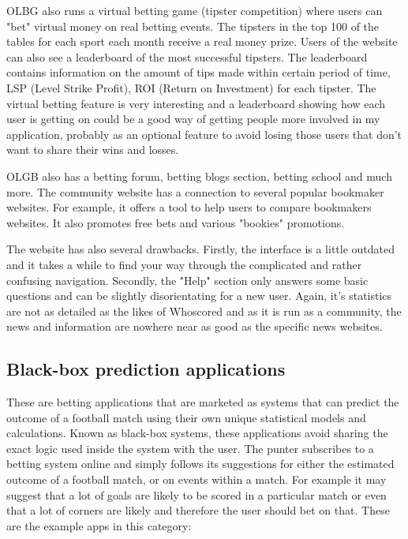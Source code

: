 OLBG also runs a virtual betting game (tipster competition) where users can "bet" virtual money on real betting events. The tipsters in the top 100 of the tables for each sport each month receive a real money prize. Users of the website can also see a leaderboard of the most successful tipsters. The leaderboard contains information on the amount of tips made within certain period of time, LSP (Level Strike Profit), ROI (Return on Investment) for each tipster. The virtual betting feature is very interesting and a leaderboard showing how each user is getting on could be a good way of getting people more involved in my application, probably as an optional feature to avoid losing those users that don’t want to share their wins and losses.

OLGB also has a betting forum, betting blogs section, betting school and much more. The community website has a connection to several popular bookmaker websites. For example, it offers a tool to help users to compare bookmakers websites. It also promotes free bets and various "bookies" promotions.

The website has also several drawbacks. Firstly, the interface is a little outdated and it takes a while to find your way through the complicated and rather confusing navigation. Secondly, the "Help" section only answers some basic questions and can be slightly disorientating for a new user. Again, it’s statistics are not as detailed as the likes of Whoscored and as it is run as a community, the news and information are nowhere near as good as the specific news websites.

\subsection{Black-box prediction applications}
\label{subsec:blackboxapplications_req}
These are betting applications that are marketed as systems that can predict the outcome of a football match using their own unique statistical models and calculations. Known as black-box systems, these applications avoid sharing the exact logic used inside the system with the user. The punter subscribes to a betting system online and simply follows its suggestions for either the estimated outcome of a football match, or on events within a match. For example it may suggest that a lot of goals are likely to be scored in a particular match or even that a lot of corners are likely and therefore the user should bet on that. These are the example apps in this category:

